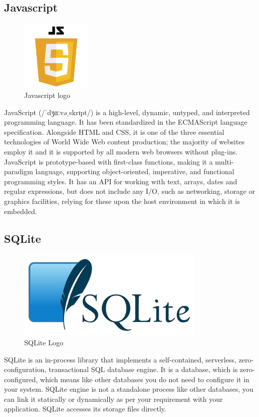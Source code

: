 \subsection{Javascript}
\begin{figure}[!ht]
\centering
\includegraphics[width=0.3\textwidth]{input/images/JS.png}
\caption{Javascript logo}
\hspace{-1.5em}
\end{figure}

JavaScript (/ˈdʒɑːvəˌskrɪpt/) is a high-level, dynamic, untyped, and interpreted programming language. It has been standardized in the ECMAScript language specification. Alongside HTML and CSS, it is one of the three essential technologies of World Wide Web content production; the majority of websites employ it and it is supported by all modern web browsers without plug-ins. JavaScript is prototype-based with first-class functions, making it a multi-paradigm language, supporting object-oriented, imperative, and functional programming styles. It has an API for working with text, arrays, dates and regular expressions, but does not include any I/O, such as networking, storage or graphics facilities, relying for these upon the host environment in which it is embedded.

\subsection{SQLite}
\begin{figure}[ht]
\centering
\includegraphics[scale=0.5]{input/images/sq.png}
\caption{SQLite Logo}
\end{figure}
SQLite is an in-process library that implements a self-contained, serverless, zero-configuration,
transactional SQL database engine. It is a database, which is zero-configured, which means like other
databases you do not need to configure it in your system. SQLite engine is not a standalone process like
other databases, you can link it statically or dynamically as per your requirement with your application.
SQLite accesses its storage files directly.

